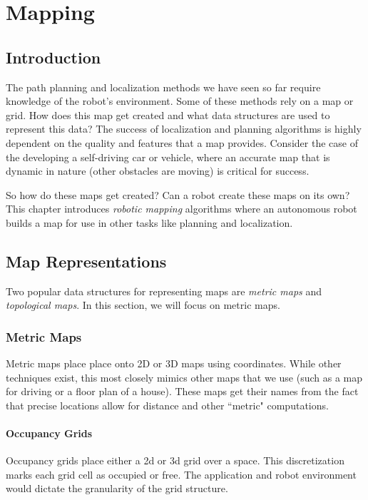 \chapter{Mapping}

\section{Introduction}
The path planning and localization methods we have seen so far require knowledge
of the robot's environment.  Some of these methods rely on a map or grid.  
How does this map get created and
what data structures are used to represent this data?  The success of localization and planning algorithms is
highly dependent on the quality and features that a map provides.  Consider the case of the 
developing a self-driving car or vehicle, where an accurate map that is dynamic in nature (other
obstacles are moving) is critical for success.

So how do these maps get created?  Can a robot create these maps on its own?  This chapter 
introduces \textit{robotic mapping} algorithms where an autonomous robot builds a map for use in other tasks like 
planning and localization.  

\section{Map Representations}

Two popular data structures for representing maps are \textit{metric maps} and \textit{topological maps}.  In this
section, we will focus on metric maps.

\subsection{Metric Maps}
Metric maps place place onto 2D or 3D maps using coordinates.  While other techniques exist, this
most closely mimics other maps that we use (such as a map for driving or a floor plan of a house).  
These maps get their names from the fact that precise locations allow for distance and other 
``metric" computations.  

\subsubsection{Occupancy Grids}
Occupancy grids place either a 2d or 3d grid over a space.  This discretization marks each grid cell as occupied or free.  
The application and robot environment would dictate the granularity of the grid structure.  


